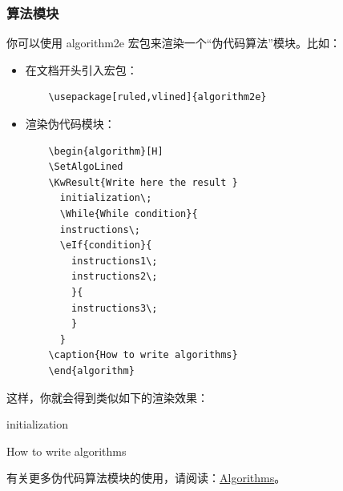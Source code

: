 \subsubsection{算法模块}

你可以使用 algorithm2e 宏包来渲染一个“伪代码算法”模块。比如：

\begin{itemize}
  \item 在文档开头引入宏包：
  \begin{verbatim}
    \usepackage[ruled,vlined]{algorithm2e}
  \end{verbatim}
  \item 渲染伪代码模块：
  \begin{verbatim}
    \begin{algorithm}[H]
    \SetAlgoLined
    \KwResult{Write here the result }
      initialization\;
      \While{While condition}{
      instructions\;
      \eIf{condition}{
        instructions1\;
        instructions2\;
        }{
        instructions3\;
        }
      }
    \caption{How to write algorithms}
    \end{algorithm}
  \end{verbatim}
\end{itemize}

这样，你就会得到类似如下的渲染效果：

\begin{algorithm}[H]
  \SetAlgoLined
  initialization\;
  \caption{How to write algorithms}
\end{algorithm}

有关更多伪代码算法模块的使用，请阅读：\href{https://www.overleaf.com/learn/latex/algorithms}{Algorithms}。
